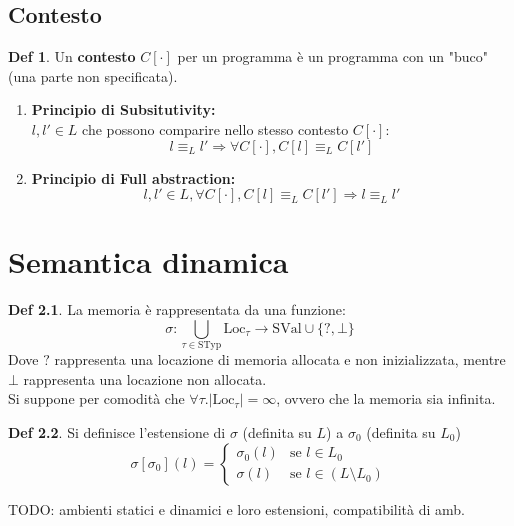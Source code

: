 \documentclass[a4paper]{report}
\theoremstyle{definition} \newtheorem*{defi}{Def}
\theoremstyle{plain} \newtheorem{lemma}{Lemma}
\theoremstyle{plain} \newtheorem{teo}{Teorema}
\theoremstyle{remark} \newtheorem*{es}{Esempio}
\begin{document}
\section{Contesto}
\begin{defi}
	Un {\bf contesto} $C[\cdot]$ per un programma è un programma con un "buco" (una parte non specificata).
	\end{defi}
	\begin{enumerate}
	\item {\bf Principio di Subsitutivity:}
	\\
	$l, l' \in L$ che possono comparire nello stesso contesto $C[\cdot]$:
	$$
		l \equiv_L l' \Rightarrow \forall C[\cdot] , C[l] \equiv_L C[l']
	$$
	\item {\bf Principio di Full abstraction:}
	$$
		l,l' \in L, \forall C[\cdot], C[l] \equiv_L C[l'] \Longrightarrow l \equiv_L l'
	$$
\end{enumerate}

\chapter{Semantica dinamica}
\begin{defi}
  La memoria è rappresentata da una funzione:
  \begin{equation}
    \sigma:\bigcup_{\tau \in \mathrm{STyp}} \mathrm{Loc}_\tau \rightarrow \mathrm{SVal} \cup \{?,\bot\}
  \end{equation}
  Dove $?$ rappresenta una locazione di memoria allocata e non inizializzata,
  mentre $\bot$ rappresenta una locazione non allocata.\\
  Si suppone per comodità che $\forall \tau.\lvert\mathrm{Loc}_\tau\rvert = \infty$,
  ovvero che la memoria sia infinita.
\end{defi}
\begin{defi}
  Si definisce l'estensione di $\sigma$ (definita su $L$) a $\sigma_0$ (definita su $L_0$)
  \begin{equation}
    \sigma[\sigma_0](l)=
    \begin{cases}
      \sigma_0(l) & \text{se } l \in L_0 \\
      \sigma(l) & \text{se } l \in (L \setminus L_0)
    \end{cases}
  \end{equation}
\end{defi}
TODO: ambienti statici e dinamici e loro estensioni, compatibilità di amb.
\end{document}
